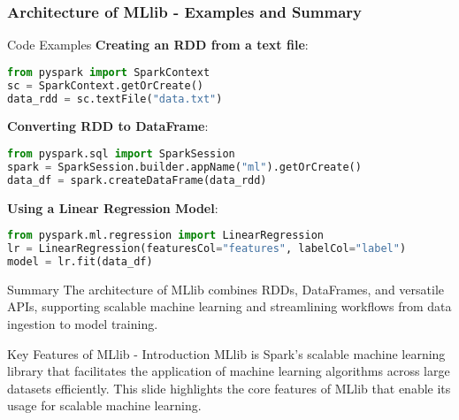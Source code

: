 \documentclass[aspectratio=169]{beamer}
\begin{document}
\begin{frame}[fragile]
    \frametitle{Architecture of MLlib - Examples and Summary}
    \begin{block}{Code Examples}
        \textbf{Creating an RDD from a text file}:
        \begin{lstlisting}[language=Python]
from pyspark import SparkContext
sc = SparkContext.getOrCreate()
data_rdd = sc.textFile("data.txt")
        \end{lstlisting}

        \textbf{Converting RDD to DataFrame}:
        \begin{lstlisting}[language=Python]
from pyspark.sql import SparkSession
spark = SparkSession.builder.appName("ml").getOrCreate()
data_df = spark.createDataFrame(data_rdd)
        \end{lstlisting}

        \textbf{Using a Linear Regression Model}:
        \begin{lstlisting}[language=Python]
from pyspark.ml.regression import LinearRegression
lr = LinearRegression(featuresCol="features", labelCol="label")
model = lr.fit(data_df)
        \end{lstlisting}
    \end{block}
    
    \begin{block}{Summary}
        The architecture of MLlib combines RDDs, DataFrames, and versatile APIs, supporting scalable machine learning and streamlining workflows from data ingestion to model training.
    \end{block}
\end{frame}

\begin{frame}[fragile]{Key Features of MLlib - Introduction}
    MLlib is Spark's scalable machine learning library that facilitates the application of machine learning algorithms across large datasets efficiently. This slide highlights the core features of MLlib that enable its usage for scalable machine learning.
\end{frame}
\end{document}
